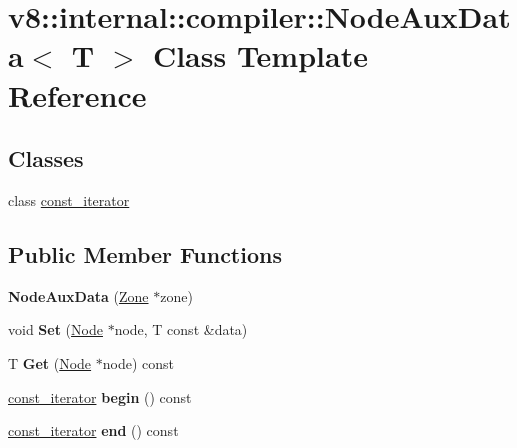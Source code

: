 \hypertarget{classv8_1_1internal_1_1compiler_1_1_node_aux_data}{}\section{v8\+:\+:internal\+:\+:compiler\+:\+:Node\+Aux\+Data$<$ T $>$ Class Template Reference}
\label{classv8_1_1internal_1_1compiler_1_1_node_aux_data}
\subsection*{Classes}
\begin{DoxyCompactItemize}
\item 
class \hyperlink{classv8_1_1internal_1_1compiler_1_1_node_aux_data_1_1const__iterator}{const\+\_\+iterator}
\end{DoxyCompactItemize}
\subsection*{Public Member Functions}
\begin{DoxyCompactItemize}
\item 
{\bfseries Node\+Aux\+Data} (\hyperlink{classv8_1_1internal_1_1_zone}{Zone} $\ast$zone)\hypertarget{classv8_1_1internal_1_1compiler_1_1_node_aux_data_a90b80c8aeae32066ce1f5e4c574b3cfa}{}\label{classv8_1_1internal_1_1compiler_1_1_node_aux_data_a90b80c8aeae32066ce1f5e4c574b3cfa}

\item 
void {\bfseries Set} (\hyperlink{classv8_1_1internal_1_1compiler_1_1_node}{Node} $\ast$node, T const \&data)\hypertarget{classv8_1_1internal_1_1compiler_1_1_node_aux_data_a9516881a5e8f10b5c1a4fb7d60c8671b}{}\label{classv8_1_1internal_1_1compiler_1_1_node_aux_data_a9516881a5e8f10b5c1a4fb7d60c8671b}

\item 
T {\bfseries Get} (\hyperlink{classv8_1_1internal_1_1compiler_1_1_node}{Node} $\ast$node) const \hypertarget{classv8_1_1internal_1_1compiler_1_1_node_aux_data_a7980d97805bc4729a109f1319034f82a}{}\label{classv8_1_1internal_1_1compiler_1_1_node_aux_data_a7980d97805bc4729a109f1319034f82a}

\item 
\hyperlink{classv8_1_1internal_1_1compiler_1_1_node_aux_data_1_1const__iterator}{const\+\_\+iterator} {\bfseries begin} () const \hypertarget{classv8_1_1internal_1_1compiler_1_1_node_aux_data_a03787ce19032bd65091f0e5757544c1e}{}\label{classv8_1_1internal_1_1compiler_1_1_node_aux_data_a03787ce19032bd65091f0e5757544c1e}

\item 
\hyperlink{classv8_1_1internal_1_1compiler_1_1_node_aux_data_1_1const__iterator}{const\+\_\+iterator} {\bfseries end} () const \hypertarget{classv8_1_1internal_1_1compiler_1_1_node_aux_data_ac8b8c862f7d406360c569bcea7018152}{}\label{classv8_1_1internal_1_1compiler_1_1_node_aux_data_ac8b8c862f7d406360c569bcea7018152}

\end{DoxyCompactItemize}
